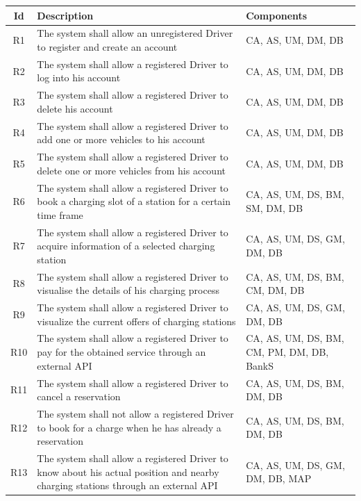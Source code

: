 \documentclass[../main.tex]{subfiles}
\begin{document}
\begin{center}
\begin{longtable}{| c | p{9cm} | p{5cm} | } 
\hline
\textbf{Id} & \textbf{Description}  & \textbf{Components}\\
\hline
R1 & The system shall allow an unregistered Driver to register and create an account & CA, AS, UM, DM, DB\\ 
\hline
R2 & The system shall allow a registered Driver to log into his account & CA, AS, UM, DM, DB\\
\hline
R3 & The system shall allow a registered Driver to delete his account  & CA, AS, UM, DM, DB\\
\hline
R4 & The system shall allow a registered Driver to add one or more vehicles to his account 
 & CA, AS, UM, DM, DB\\
\hline
R5 & The system shall allow a registered Driver to delete one or more vehicles from his account
 & CA, AS, UM, DM, DB\\
\hline
R6 & The system shall allow a registered Driver to book a charging slot of a station for a certain time frame
& CA, AS, UM, DS, BM, SM, DM, DB\\
\hline
R7 & The system shall allow a registered Driver to acquire information of a selected charging station
& CA, AS, UM, DS, GM, DM, DB\\
\hline
R8 & The system shall allow a registered Driver to visualise the details of his charging process & CA, AS, UM, DS, BM, CM, DM, DB\\
\hline
R9 & The system shall allow a registered Driver to visualize the current offers of charging stations
& CA, AS, UM, DS, GM, DM, DB\\
\hline
R10 & The system shall allow a registered Driver to pay for the obtained service through an external API
& CA, AS, UM, DS, BM, CM, PM, DM, DB, BankS\\
\hline
R11 & The system shall allow a registered Driver to cancel a reservation 
& CA, AS, UM, DS, BM, DM, DB\\
\hline
R12 & The system shall not allow a registered Driver to book for a charge when he has already a reservation
& CA, AS, UM, DS, BM, DM, DB\\
\hline
R13 & The system shall allow a registered Driver to know about his actual position and nearby charging stations through an external API
& CA, AS, UM, DS, GM, DM, DB, MAP\\

\end{longtable}
\end{center}
\end{document}
